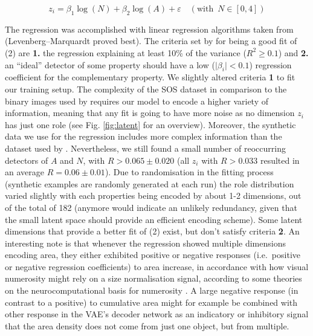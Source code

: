 \documentclass[twocolumn]{article}
\begin{document}
\[z_i = \beta_1 \log(N) + \beta_2\log(A) + \varepsilon \quad (\textrm{with }\, N \in [0, 4]) \tag{2} \]

\noindent The regression was accomplished with linear regression algorithms taken
from \citet{newville2016lmfit} (Levenberg--Marquardt proved best). The
criteria set by \citet{stoianov2012} for being a good fit of (2)
are \textbf{1.} the regression explaining at least 10\% of the variance
(\(R^2 \geq 0.1\)) and \textbf{2.}  an ``ideal'' detector of some
property should have a low (\(\mid\beta_i\mid < 0.1\)) regression
coefficient for the complementary property. We slightly altered criteria
\textbf{1} to fit our training setup. The complexity of the SOS
dataset in comparison to the binary images used by \citet{stoianov2012}
requires our model to encode a higher variety of information, meaning
that any fit is going to have more noise as no dimension \(z_i\) has just one
role (see Fig. \ref{fig:latent} for an overview). Moreover, the synthetic data we
use for the regression includes more complex information than the
dataset used by \citet{stoianov2012}. Nevertheless, we still found a
small number of reoccurring detectors of \(A\) and \(N\), with
\(R > 0.065 \pm 0.020\) (all \(z_i\) with \(R > 0.033\) resulted in an
average \(R= 0.06 \pm 0.01\)). Due to randomisation in the fitting
process (synthetic examples are randomly generated at each run) the role
distribution varied slightly with each properties being encoded by about
1-2 dimensions, out of the total of 182 (anymore would indicate an
unlikely redundancy, given that the small latent space should provide an
efficient encoding scheme). Some latent dimensions that provide a better
fit of (2) exist, but don't satisfy criteria \textbf{2}. An
interesting note is that whenever the regression showed multiple
dimensions encoding area, they either exhibited positive or negative
responses (i.e.~positive or negative regression coefficients) to area
increase, in accordance with how visual numerosity might rely on a size
normalisation signal, according to some theories on the
neurocomputational basis for numerosity \citep[see][ for a
discussion]{stoianov2012}. A large negative response (in contrast to a
positive) to cumulative area might for example be combined with other
response in the VAE's decoder network as an indicatory or inhibitory
signal that the area density does not come from just one object, but
from multiple.
\end{document}
